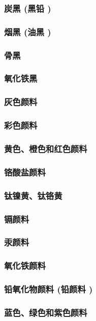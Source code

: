 \documentclass[UTF8]{../../ApplicationUniverse}
\begin{document}
        \subsubsection{炭黑 (黑铅 )}
        \subsubsection{烟黑 (油黑 )}
        \subsubsection{骨黑}
        \subsubsection{氧化铁黑}
    \subsubsection{灰色颜料}
\subsubsection{彩色颜料}
    \subsubsection{黄色、橙色和红色颜料}
        \subsubsection{铬酸盐颜料}
        \subsubsection{钛镍黄、钛铬黄}
        \subsubsection{镉颜料}
        \subsubsection{汞颜料}
        \subsubsection{氧化铁颜料}
        \subsubsection{铅氧化物颜料 (铅颜料 )}
    \subsubsection{蓝色、绿色和紫色颜料}
\end{document}
